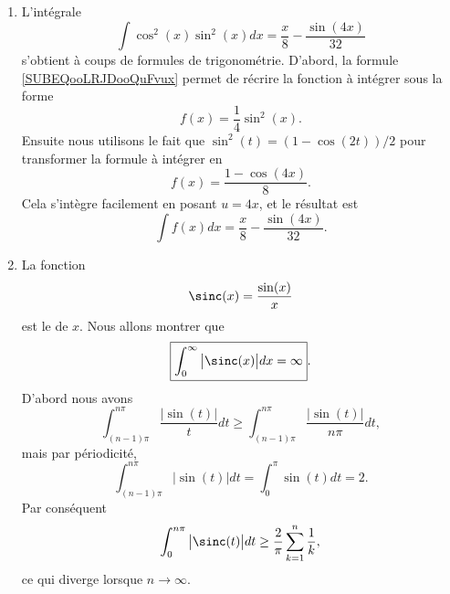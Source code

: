 \begin{enumerate}
	\item
	      L'intégrale
	      \begin{equation}        \label{EqTrucIntcossqsinsq}
		      \boxed{ \int\cos^2(x)\sin^2(x)dx=\frac{ x }{ 8 }-\frac{ \sin(4x) }{ 32 } }
	      \end{equation}
	      s'obtient à coups de formules de trigonométrie. D'abord, la formule \eqref{SUBEQooLRJDooQuFvux} permet de récrire la fonction à intégrer sous la forme
	      \begin{equation}
		      f(x)=\frac{1}{ 4 }\sin^2(x).
	      \end{equation}
	      Ensuite nous utilisons le fait que \( \sin^2(t)=(1-\cos(2t))/2\) pour transformer la formule à intégrer en
	      \begin{equation}
		      f(x)=\frac{ 1-\cos(4x) }{ 8 }.
	      \end{equation}
	      Cela s'intègre facilement en posant \( u=4x\), et le résultat est
	      \begin{equation}
		      \int f(x)dx=\frac{ x }{ 8 }-\frac{ \sin(4x) }{ 32 }.
	      \end{equation}

	\item

	      La fonction
	      \begin{equation}
		      \sinc(x)=\frac{ \sin(x) }{ x }
	      \end{equation}
	      est le  de \( x\). Nous allons montrer que
	      \begin{equation}    \label{EqKNOmLEd}
		      \boxed{  \int_0^{\infty}\big| \sinc(x) \big|dx=\infty  }.
	      \end{equation}
	      D'abord nous avons
	      \begin{equation}
		      \int_{(n-1)\pi}^{n\pi}\frac{ \big| \sin(t) \big| }{ t }dt\geq \int_{(n-1)\pi}^{n\pi}\frac{ \big| \sin(t) \big| }{ n\pi }dt,
	      \end{equation}
	      mais par périodicité,
	      \begin{equation}
		      \int_{(n-1)\pi}^{n\pi}\big| \sin(t) \big|dt=\int_0^{\pi}\sin(t)dt=2.
	      \end{equation}
	      Par conséquent
	      \begin{equation}
		      \int_0^{n\pi}\big| \sinc(t) \big|dt\geq \frac{ 2 }{ \pi }\sum_{k=1}^n\frac{1}{ k },
	      \end{equation}
	      ce qui diverge lorsque \( n\to \infty\).


\end{enumerate}
